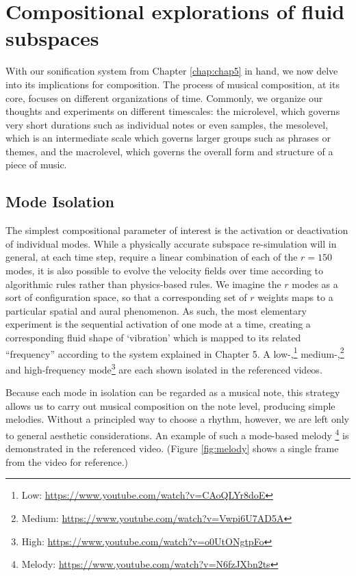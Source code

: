 \chapter[Compositional exploration of fluid subspaces]{Compositional explorations of fluid subspaces}
\label{chap:chap6}

With our sonification system from Chapter \ref{chap:chap5} in hand, we now delve into its implications for composition. The process of musical composition, at its core, focuses on different
organizations of time. Commonly, we organize our thoughts and experiments on different timescales: the microlevel, which governs very short durations such as individual notes
or even samples, the mesolevel, which is an intermediate scale which governs larger groups such as phrases or themes, and the macrolevel, which governs the overall form and structure of a piece of music. 

\section{Mode Isolation}
The simplest compositional parameter of interest is the activation or deactivation of individual modes. While a physically accurate subspace re-simulation will in general, at each time step, require a linear combination of each of the $r = 150$ modes, it is also possible to evolve the velocity fields over time according to algorithmic rules rather than physics-based rules. We imagine the $r$ modes as a sort of configuration space, so that a corresponding set of $r$ weights maps to a particular spatial and aural phenomenon. As such, the most elementary experiment is the sequential activation of one mode at a time, creating a corresponding fluid shape of `vibration' which is mapped to its related ``frequency'' according to the system explained in Chapter 5. A low-,\footnote{Low: \url{https://www.youtube.com/watch?v=CAoQLYr8doE}}  medium-,\footnote{Medium: \url{https://www.youtube.com/watch?v=Vwpi6U7AD5A}} and high-frequency mode\footnote{High: \url{https://www.youtube.com/watch?v=o0UtONgtpFo}} are each shown isolated in the referenced videos. 

Because each mode in isolation can be regarded as a musical note, this strategy allows us to carry out musical composition on the note level, producing simple melodies. Without a principled way to choose a rhythm,
however, we are left only to general aesthetic considerations. An example of such a mode-based melody \footnote{Melody: \url{https://www.youtube.com/watch?v=N6fzJXbn2ts}} is demonstrated in the referenced video. (Figure \ref{fig:melody} shows a single 
frame from the video for reference.)

